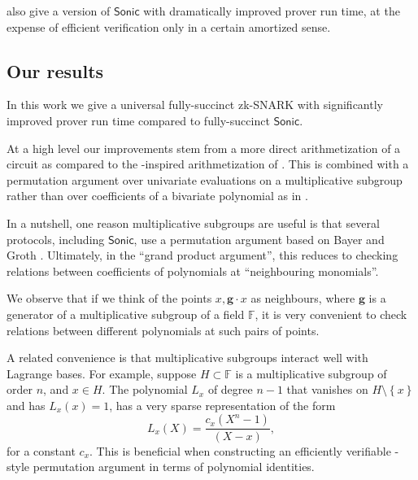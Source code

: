 \documentclass[11pt]{article} %
\newcommand{\F}{\ensuremath{\mathbb F}\xspace}
\newcommand{\sonic}{\ensuremath{\mathsf{Sonic}}\xspace}
\newcommand{\set}[1]{\ensuremath{\left\{#1\right\}}\xspace}
\newcommand{\hgen}{\ensuremath{\mathbf{g}}\xspace}
\begin{document}
\cite{sonic} also give a version of \sonic with dramatically improved prover run time, at the expense of efficient verification only in a certain amortized sense.

\subsection{Our results}
In this work we give a universal fully-succinct zk-SNARK with significantly improved prover run time compared to fully-succinct \sonic.

At a high level our improvements stem from a more direct arithmetization of a circuit as compared to the \cite{Bootle}-inspired arithmetization of \cite{sonic}. This is combined with a permutation argument over univariate evaluations on a multiplicative subgroup rather than over coefficients of a bivariate polynomial as in \cite{sonic}.

In a nutshell, one reason multiplicative subgroups are useful is that several protocols, including \sonic,  use a permutation argument based on Bayer and Groth \cite{permorig}. Ultimately, in the ``grand product argument'', this reduces to checking relations between coefficients of polynomials at ``neighbouring monomials''.

We observe that if we think of the points $x,\hgen\cdot x$ as neighbours, where \hgen is a generator of a multiplicative subgroup of a field \F, it is very convenient to check relations between different polynomials at such pairs of points.

A related convenience is that multiplicative subgroups interact well with Lagrange bases.
For example, suppose  $H\subset \F$ is a multiplicative subgroup of order $n$, and $x\in H$.  The polynomial $L_x$ of degree $n-1$  that vanishes on $H\setminus\set{x}$ and has $L_x(x)=1$, has a very sparse representation of the form
\[L_x(X)= \frac{c_x(X^{n}-1)}{(X-x)},\]
for a constant $c_x$.
This is beneficial when constructing an efficiently verifiable \cite{permorig}-style permutation argument in terms of polynomial identities.
\end{document}
